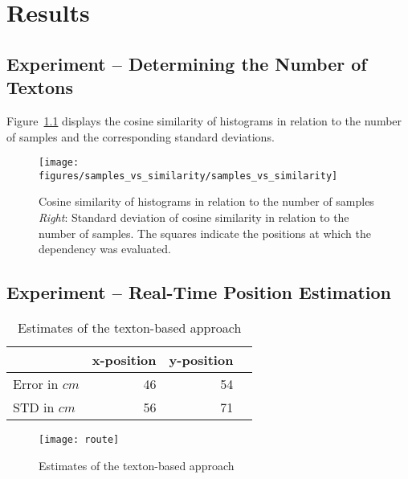 \documentclass{report}
\begin{document}


\chapter{Results}
\label{chap:results}

\section{Experiment -- Determining the Number of Textons}
\label{sec:numtextons}

Figure~\ref{fig:cosine} displays the cosine similarity of histograms
in relation to the number of samples and the corresponding standard
deviations.

\begin{figure}[h!]
\begin{center}
\texttt{[image: figures/samples\_vs\_similarity/samples\_vs\_similarity]}
\caption{{\label{fig:cosine}
Cosine similarity of histograms in relation to the number of
samples \emph{Right}: Standard deviation of cosine similarity in
relation to the number of samples. The squares indicate the
positions at which the dependency was evaluated.%
}}
\end{center}
\end{figure}

\section{Experiment -- Real-Time Position Estimation}
\label{sec:experiment-real-time}

\begin{table}[H]
  \centering
  \begin{tabular}{lrrr}
    \toprule
    & x-position & y-position\\
    \midrule
    Error in $cm$ & 46 & 54\\
    STD in $cm$ & 56 & 71\\
    \bottomrule
  \end{tabular}
  \caption[Estimates of the texton-based approach]{Estimates of the texton-based approach}
  \label{tab:targetlanding}
\end{table}

\begin{figure}
\texttt{[image: route]}
  \caption[Estimates of the texton-based approach]{Estimates of the texton-based approach}
  \label{fig:route}
\end{figure}
\end{document}
